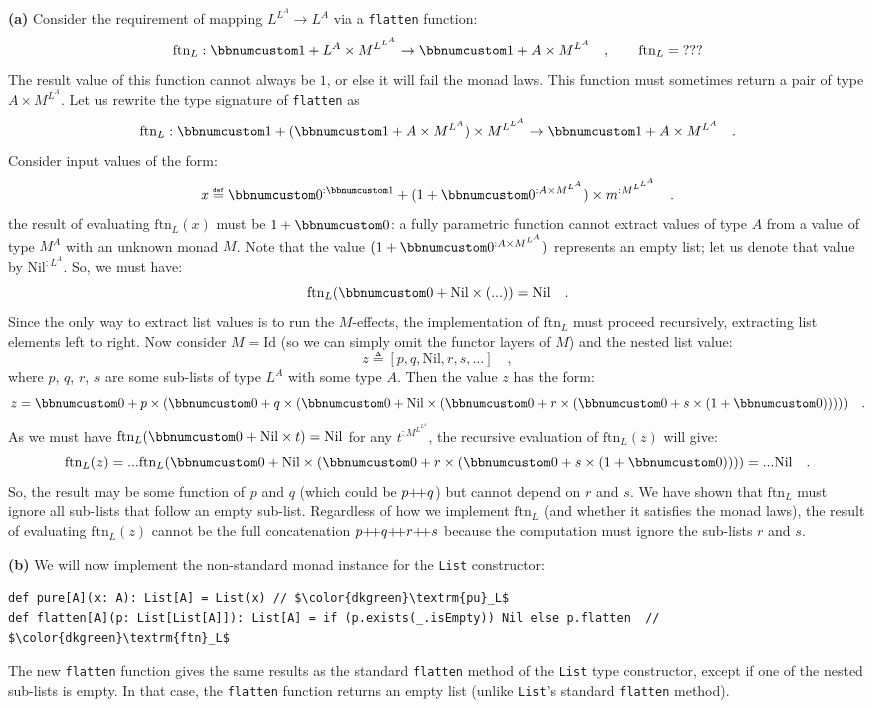 \textbf{(a)} Consider the requirement of mapping $L^{L^{A}}\rightarrow L^{A}$
via a \lstinline!flatten! function:
\[
\text{ftn}_{L}:\bbnum 1+L^{A}\times M^{L^{L^{A}}}\rightarrow\bbnum 1+A\times M^{L^{A}}\quad,\quad\quad\text{ftn}_{L}=\text{???}
\]
The result value of this function cannot always be $1$, or else it
will fail the monad laws. This function must sometimes return a pair
of type $A\times M^{L^{A}}$. Let us rewrite the type signature of
\lstinline!flatten! as
\[
\text{ftn}_{L}:\bbnum 1+(\bbnum 1+A\times M^{L^{A}})\times M^{L^{L^{A}}}\rightarrow\bbnum 1+A\times M^{L^{A}}\quad.
\]
Consider input values of the form:
\[
x\triangleq\bbnum 0^{:\bbnum 1}+(1+\bbnum 0^{:A\times M^{L^{A}}})\times m^{:M^{L^{L^{A}}}}\quad.
\]
the result of evaluating $\text{ftn}_{L}(x)$ must be $1+\bbnum 0$:
a fully parametric function cannot extract values of type $A$ from
a value of type $M^{A}$ with an unknown monad $M$. Note that the
value $(1+\bbnum 0^{:A\times M^{L^{A}}})$ represents an empty list;
let us denote that value by $\text{Nil}^{:L^{A}}$. So, we must have:
\[
\text{ftn}_{L}(\bbnum 0+\text{Nil}\times(...))=\text{Nil}\quad.
\]
Since the only way to extract list values is to run the $M$-effects,
the implementation of $\text{ftn}_{L}$ must proceed recursively,
extracting list elements left to right. Now consider $M=\text{Id}$
(so we can simply omit the functor layers of $M$) and the nested
list value:
\[
z\triangleq\left[p,q,\text{Nil},r,s,...\right]\quad,
\]
 where $p$, $q$, $r$, $s$ are some sub-lists of type $L^{A}$
with some type $A$. Then the value $z$ has the form:
\[
z=\bbnum 0+p\times(\bbnum 0+q\times(\bbnum 0+\text{Nil}\times(\bbnum 0+r\times(\bbnum 0+s\times(1+\bbnum 0)))))\quad.
\]
As we must have $\text{ftn}_{L}(\bbnum 0+\text{Nil}\times t)=\text{Nil}$
for any $t^{:M^{L^{L^{A}}}}$, the recursive evaluation of $\text{ftn}_{L}(z)$
will give:
\[
\text{ftn}_{L}(z)=...\text{ftn}_{L}(\bbnum 0+\text{Nil}\times(\bbnum 0+r\times(\bbnum 0+s\times(1+\bbnum 0))))=...\text{Nil}\quad.
\]
So, the result may be some function of $p$ and $q$ (which could
be $p{\displaystyle }{+\negmedspace+} q$) but cannot depend on $r$ and $s$. We have shown
that $\text{ftn}_{L}$ must ignore all sub-lists that follow an empty
sub-list. Regardless of how we implement $\text{ftn}_{L}$ (and whether
it satisfies the monad laws), the result of evaluating $\text{ftn}_{L}(z)$
cannot be the full concatenation $p{\displaystyle }{+\negmedspace+} q{\displaystyle }{+\negmedspace+} r{\displaystyle }{+\negmedspace+} s$ because
the computation must ignore the sub-lists $r$ and $s$.

\textbf{(b)} We will now implement the non-standard monad instance
for the \lstinline!List! constructor:
\begin{lstlisting}[mathescape=true]
def pure[A](x: A): List[A] = List(x) // $\color{dkgreen}\textrm{pu}_L$
def flatten[A](p: List[List[A]]): List[A] = if (p.exists(_.isEmpty)) Nil else p.flatten  // $\color{dkgreen}\textrm{ftn}_L$
\end{lstlisting}
The new \lstinline!flatten! function gives  the same results as the
standard \lstinline!flatten! method of the \lstinline!List! type
constructor, except if one of the nested sub-lists is empty. In that
case, the \lstinline!flatten! function returns an empty list (unlike
\lstinline!List!\textsf{'}s standard \lstinline!flatten! method).

